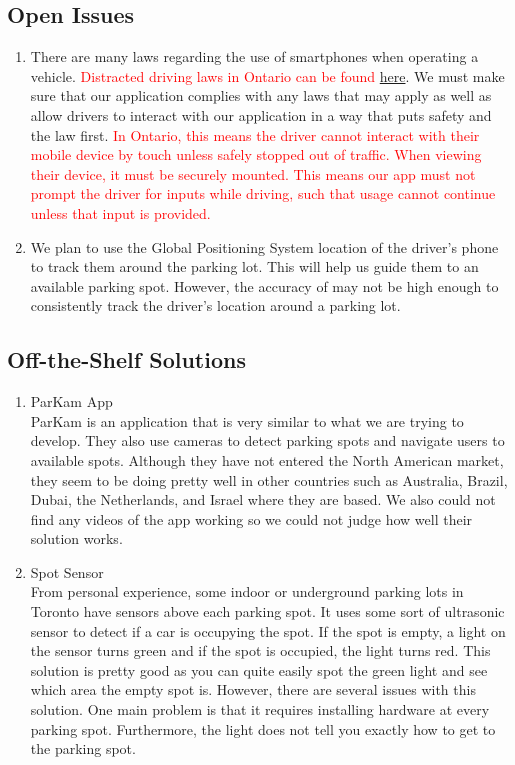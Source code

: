 \documentclass[12pt,letterpaper]{article}
\newcommand{\term}[2][]{\ifthenelse{\equal{#1}{}}{\hyperref[Term:#2]{\textbf{#2}}}{\hyperref[Term:#1]{\textbf{#2}}}}
\begin{document}
\subsection{Open Issues}
\begin{enumerate}
    \item There are many laws regarding the use of smartphones when operating a
    vehicle. \textcolor{red}{Distracted driving laws in Ontario can be found}
    \href{https://www.ontario.ca/page/distracted-driving}{here}. We must make
    sure that our application complies with any laws that may apply as well as
    allow drivers to interact with our application in a way that puts safety and
    the law first. \textcolor{red}{In Ontario, this means the driver cannot
    interact with their mobile device by touch unless safely stopped out of
    traffic. When viewing their device, it must be securely mounted. This means
    our app must not prompt the driver for inputs while driving, such that usage
    cannot continue unless that input is provided.}
    
    \item We plan to use the Global Positioning System location of the driver's
    phone to track them around the parking lot. This will help us guide them to
    an available parking spot. However, the accuracy of \term{GPS} may not be
    high enough to consistently track the driver's location around a parking
    lot.
\end{enumerate}

\subsection{Off-the-Shelf Solutions}
\begin{enumerate}
    \item ParKam App\\
    ParKam is an application that is very similar to what we are trying to
    develop. They also use cameras to detect parking spots and navigate users to
    available spots. Although they have not entered the North American market,
    they seem to be doing pretty well in other countries such as Australia,
    Brazil, Dubai, the Netherlands, and Israel where they are based. We also
    could not find any videos of the app working so we could not judge how well
    their solution works.
    
    \item Spot Sensor\\
    From personal experience, some indoor or underground parking lots in Toronto
    have sensors above each parking spot. It uses some sort of ultrasonic sensor
    to detect if a car is occupying the spot. If the spot is empty, a light on
    the sensor turns green and if the spot is occupied, the light turns red.
    This solution is pretty good as you can quite easily spot the green light
    and see which area the empty spot is. However, there are several issues with
    this solution. One main problem is that it requires installing hardware at
    every parking spot. Furthermore, the light does not tell you exactly how to
    get to the parking spot.
\end{enumerate}
\end{document}
